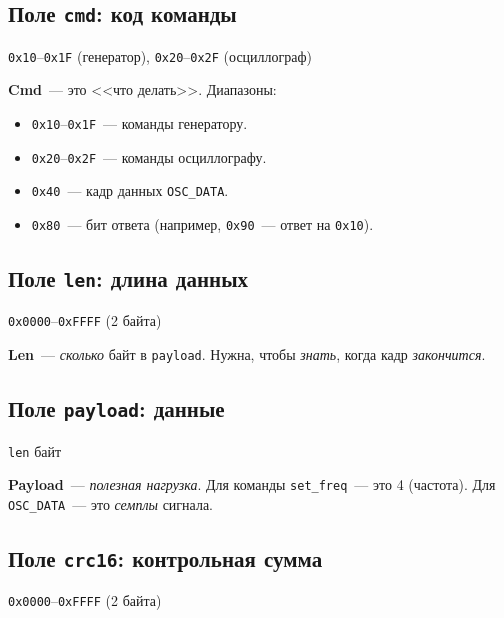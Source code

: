 \subsection{Поле \texttt{cmd}: код команды}

\begin{center}
\texttt{0x10}--\texttt{0x1F} (генератор), \texttt{0x20}--\texttt{0x2F} (осциллограф)
\end{center}

\textbf{Cmd}~--- это <<что делать>>. Диапазоны:
\begin{itemize}
    \item \texttt{0x10}--\texttt{0x1F}~--- команды генератору.
    \item \texttt{0x20}--\texttt{0x2F}~--- команды осциллографу.
    \item \texttt{0x40}~--- кадр данных \texttt{OSC\_DATA}.
    \item \texttt{0x80}~--- бит ответа (например, \texttt{0x90}~--- ответ на \texttt{0x10}).
\end{itemize}

\subsection{Поле \texttt{len}: длина данных}

\begin{center}
\texttt{0x0000}--\texttt{0xFFFF} (2 байта)
\end{center}

\textbf{Len}~--- \emph{сколько} байт в \texttt{payload}.
Нужна, чтобы \emph{знать}, когда кадр \emph{закончится}.

\subsection{Поле \texttt{payload}: данные}

\begin{center}
\texttt{len} байт
\end{center}

\textbf{Payload}~--- \emph{полезная нагрузка}. Для команды
\texttt{set\_freq}~--- это \SI{4}{\byte} (частота).
Для \texttt{OSC\_DATA}~--- это \emph{семплы} сигнала.

\subsection{Поле \texttt{crc16}: контрольная сумма}

\begin{center}
\texttt{0x0000}--\texttt{0xFFFF} (2 байта)
\end{center}

